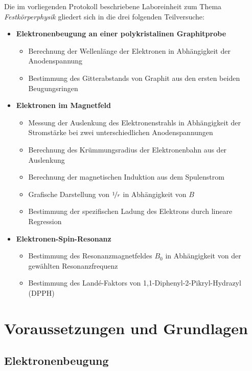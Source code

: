 \documentclass[ngerman]{scrartcl}
\begin{document}
Die im vorliegenden Protokoll beschriebene Laboreinheit zum Thema \textit{Festkörperphysik} gliedert sich in die drei folgenden Teilversuche:
%
\begin{itemize}
    \item \textbf{Elektronenbeugung an einer polykristalinen Graphitprobe}
          \begin{itemize}
              \item Berechnung der Wellenlänge der Elektronen in Abhängigkeit der Anodenspannung
              \item Bestimmung des Gitterabstands von Graphit aus den ersten beiden Beugungsringen
          \end{itemize}
    \item \textbf{Elektronen im Magnetfeld}
          \begin{itemize}
              \item Messung der Auslenkung des Elektronenstrahls in Abhängigkeit der Stromstärke bei zwei unterschiedlichen Anodenspannungen
              \item Berechnung des Krümmungsradius der Elektronenbahn aus der Auslenkung
              \item Berechnung der magnetischen Induktion aus dem Spulenstrom
              \item Grafische Darstellung von $\nicefrac{1}{r}$ in Abhängigkeit von $B$
              \item Bestimmung der spezifischen Ladung des Elektrons durch lineare Regression
          \end{itemize}
    \item \textbf{Elektronen-Spin-Resonanz}
          \begin{itemize}
              \item Bestimmung des Resonanzmagnetfeldes $B_0$ in Abhängigkeit von der gewählten Resonanzfrequenz
              \item Bestimmung des Landé-Faktors von 1,1-Diphenyl-2-Pikryl-Hydrazyl (DPPH)
          \end{itemize}

\end{itemize}



\section{Voraussetzungen und Grundlagen}
\label{sec:voraussetzungen_grundlagen}

\subsection[Elektronenbeugung]{Elektronenbeugung \cite{ref:angabe_elektronen}}
\label{subsec:grundlagen_elektronenbeugung}
\end{document}
